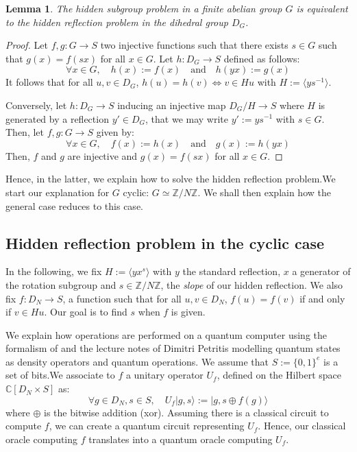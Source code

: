 \documentclass[a4paper,10pt]{report}
\theoremstyle{definition}
\theoremstyle{plain}
\newtheorem{lemma}[definition]{Lemma}
\theoremstyle{definition}
\newcommand{\Z}{\mathbb{Z}}
\newcommand{\C}{\mathbb{C}}
\renewcommand{\(}{\left(}
\renewcommand{\)}{\right)}
\begin{document}
\begin{lemma}
The hidden subgroup problem in a finite abelian group $G$ is equivalent to the hidden reflection problem in the dihedral group $D_G$.
\end{lemma}

\begin{proof}
Let $f,g: G\longrightarrow S$ two injective functions such that there exists $s\in G$ such that $g(x)=f(sx)$ for all $x\in G$.  Let $h: D_G\longrightarrow S$ defined as follows:
\[\forall x\in G, \quad h(x):=f(x) \quad \mbox{and} \quad h(yx):=g(x)\]
It follows that for all $u,v\in D_G$, $h(u)=h(v)\Longleftrightarrow v\in Hu$ with $H:=\langle ys^{-1}\rangle$.

Conversely, let $h: D_G\longrightarrow S$ inducing an injective map $D_G/H\longrightarrow S$ where $H$ is generated by a reflection $y'\in D_G$, that we may write $y':=ys^{-1}$ with $s\in G$. Then, let $f, g:G\longrightarrow S$ given by:
\[\forall x\in G, \quad f(x):=h(x) \quad \mbox{and} \quad g(x):=h(yx)\]
Then, $f$ and $g$ are injective and $g(x)=f(sx)$ for all $x\in G$.
\end{proof}

Hence, in the latter, we explain how to solve the hidden reflection problem.We start our explanation for $G$ cyclic: $G\simeq\Z/N\Z$. We shall then explain how the general case reduces to this case. 

\subsection{Hidden reflection problem in the cyclic case}

In the following, we fix $H:=\langle yx^s\rangle$ with $y$ the standard reflection, $x$ a generator of the rotation subgroup and $s\in\Z/N\Z$, the \emph{slope} of our hidden reflection.  We also fix $f:D_N\longrightarrow S$, a function such that for all $u, v\in D_N$, $f(u)=f(v)$ if and only if $v\in Hu$. Our goal is to find $s$ when $f$ is given.

We explain how operations are performed on a quantum computer using the formalism of \cite[chapter 8]{NielsanChaung} and the lecture notes of Dimitri Petritis modelling quantum states as density operators and quantum operations. We assume that $S:=\{0,1\}^e$ is a set of bits.We associate to $f$ a unitary operator $U_f$, defined on the Hilbert space $\C[D_N\times S]$ as:
\[\forall g\in D_N, s\in S, \quad U_f|g,s\rangle:=|g,s\oplus f(g)\rangle\]
where $\oplus$ is the bitwise addition (xor). Assuming there is a classical circuit to compute $f$, we can create a quantum circuit representing $U_f$. Hence, our classical oracle computing $f$ translates into a quantum oracle computing $U_f$. 
\end{document}
